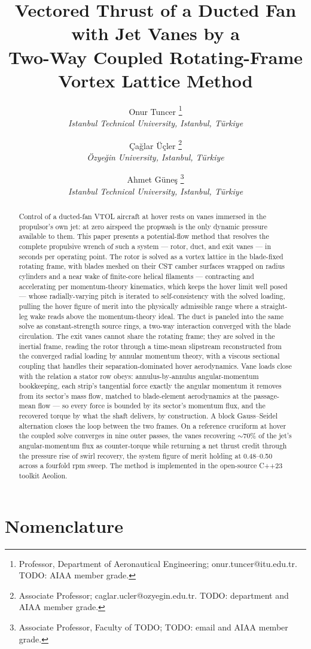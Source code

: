 \documentclass[]{aiaa-tc}%
\title{Vectored Thrust of a Ducted Fan with Jet Vanes by a\\
       Two-Way Coupled Rotating-Frame Vortex Lattice Method}
\author{
 Onur Tuncer%
  \thanks{Professor, Department of Aeronautical Engineering;
    onur.tuncer@itu.edu.tr. TODO: AIAA member grade.}\\
 {\normalsize\itshape
  Istanbul Technical University, Istanbul, T\"urkiye}
 \and
 \c{C}a\u{g}lar \"U\c{c}ler%
  \thanks{Associate Professor; caglar.ucler@ozyegin.edu.tr.
    TODO: department and AIAA member grade.}\\
 {\normalsize\itshape
  \"Ozye\u{g}in University, Istanbul, T\"urkiye}
 \and
 Ahmet G\"une\c{s}%
  \thanks{Associate Professor, Faculty of TODO; TODO: email and AIAA
    member grade.}\\
 {\normalsize\itshape
  Istanbul Technical University, Istanbul, T\"urkiye}
}
\begin{document}
\maketitle

\begin{abstract}
Control of a ducted-fan VTOL aircraft at hover rests on vanes immersed
in the propulsor's own jet: at zero airspeed the propwash is the only
dynamic pressure available to them. This paper presents a
potential-flow method that resolves the complete propulsive wrench of
such a system --- rotor, duct, and exit vanes --- in seconds per
operating point. The rotor is solved as a vortex lattice in the
blade-fixed rotating frame, with blades meshed on their CST camber
surfaces wrapped on radius cylinders and a near wake of finite-core
helical filaments --- contracting and accelerating per momentum-theory
kinematics, which keeps the hover limit well posed --- whose
radially-varying pitch is iterated to self-consistency with the solved
loading, pulling the hover figure of merit into the physically
admissible range where a straight-leg wake reads above the
momentum-theory ideal. The
duct is paneled into the same solve as constant-strength source rings,
a two-way interaction converged with the blade circulation. The exit
vanes cannot share the rotating frame; they are solved in the inertial
frame, reading the rotor through a time-mean slipstream reconstructed
from the converged radial loading by annular momentum theory, with a
viscous sectional coupling that handles their separation-dominated
hover aerodynamics. Vane loads close with the relation a stator row
obeys: annulus-by-annulus angular-momentum bookkeeping, each strip's
tangential force exactly the angular momentum it removes from its
sector's mass flow, matched to blade-element aerodynamics at the
passage-mean flow --- so every force is bounded by its sector's
momentum flux, and the recovered torque by what the shaft delivers, by
construction. A block Gauss--Seidel alternation closes the loop
between the two frames. On a reference cruciform at hover the coupled
solve converges in nine outer passes, the vanes recovering
$\sim$70\% of the jet's angular-momentum flux as counter-torque while
returning a net thrust credit through the pressure rise of swirl
recovery, the system figure of merit holding at 0.48--0.50 across a
fourfold rpm sweep. The method is implemented in the open-source C++23
toolkit Aeolion.
\end{abstract}

\section*{Nomenclature}
\end{document}
